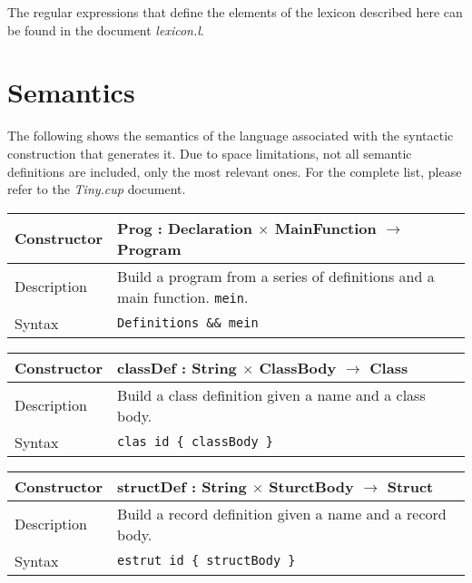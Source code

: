 \documentclass[10pt,a4paper]{article}
\begin{document}
The regular expressions that define the elements of the lexicon described here can be found in the document \textit{lexicon.l}.

\section{Semantics}

The following shows the semantics of the language associated with the syntactic construction that generates it. Due to space limitations, not all semantic definitions are included, only the most relevant ones. For the complete list, please refer to the \textit{Tiny.cup} document.

\begin{center}
    \begin{tabular}[h]{|p{}|p{}|}
        \hline
        Constructor & Prog : Declaration $\times$ MainFunction $\rightarrow$ Program \\
        \hline
        Description & Build a program from a series of definitions and a main function. \texttt{mein}. \\
        \hline
        Syntax & \texttt{Definitions \&\& mein} \\
        \hline
    \end{tabular}
\end{center}

\begin{center}
    \begin{tabular}[h]{|p{}|p{}|}
        \hline
        Constructor & classDef : String $\times$ ClassBody $\rightarrow$ Class \\
        \hline
        Description & Build a class definition given a name and a class body.\\
        \hline
        Syntax & \texttt{clas id \{ classBody \}} \\
        \hline
    \end{tabular}
\end{center}

\begin{center}
        \begin{tabular}[h]{|p{}|p{}|}
            \hline
            Constructor & structDef : String $\times$ SturctBody $\rightarrow$ Struct \\
            \hline
            Description & Build a record definition given a name and a record body.\\
            \hline
            Syntax & \texttt{estrut id \{ structBody \}} \\
            \hline
        \end{tabular}
\end{center}
\end{document}
